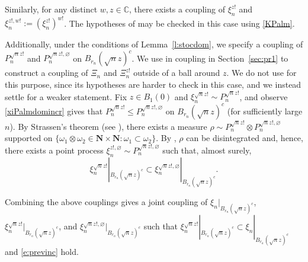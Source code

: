 \documentclass{amsart}
\theoremstyle{plain}
\theoremstyle{definition}
\theoremstyle{remark}
\begin{document}
Similarly, for any distinct $w,z \in \mathbb{C}$, there exists a coupling of $\xi_n^{z!}$  and $\xi_n^{z!, w!}  := (\xi_n^{z!})^{w!}$. The hypotheses of \cite[Theorem 1]{MR21} may be checked in this case using \eqref{KPalm}. 


Additionally, under the conditions of Lemma~\ref{l:stocdom}, we specify a coupling of $P_n^{\sqrt n z!}$ and  $P_n^{\sqrt{n} z!,\varnothing}$ on $B_{r_n}(\sqrt n z)^c$. We use in coupling in 
Section~\ref{sec:pr1} to construct a coupling of $\Xi_n$ and $\Xi_n^{z!}$ outside of a ball around $z$. 
We do not use \cite[Theorem 1]{MR21} for this purpose, since its hypotheses are harder to check in this case, and we instead settle for a weaker statement.  
Fix $z \in B_1(0)$ and $\xi_n^{\sqrt{n} z!} \sim P_n^{\sqrt{n} z!}$, and observe \eqref{xiPalmdomincr} gives that $P_n^{\sqrt n z!} \le P_n^{\sqrt{n} z!,\varnothing}$ on $B_{r_n}(\sqrt n z)^c$ (for sufficiently large $n$).
By Strassen's theorem (see \cite{lindvall}), there exists a measure $\rho \sim P_n^{\sqrt n z!} \otimes P_n^{\sqrt{n} z!,\varnothing}$ supported on $\{\omega_1 \otimes \omega_2 \in \mathbf N \times \mathbf N: \omega_1 \subset \omega_2\}$. By \cite[Theorem 3.4(i)]{K03}, $\rho$ can be disintegrated and, hence, there exists a point process $\xi_n^{z!,\varnothing}  \sim P_n^{\sqrt{n} z!,\varnothing}$ such that, almost surely,
\begin{equation}\label{e:previnc}
\xi_n^{\sqrt n z!}|_{B_{r_{n}}(\sqrt nz)^c} \subset \xi_n^{\sqrt{n} z!,\varnothing}|_{B_{r_{n}}(\sqrt nz)^c} .
\end{equation}

Combining the above couplings gives a joint coupling of $\xi_n|_{B_{r_{n}}(\sqrt nz)^c}$, $\xi_n^{\sqrt n z!}|_{B_{r_{n}}(\sqrt nz)^c}$, and  $\xi_n^{\sqrt{n} z!,\varnothing}|_{B_{r_{n}}(\sqrt nz)^c}$ such that 
$\xi_n^{\sqrt n z!}|_{B_{r_{n}}(\sqrt nz)^c} \subset \xi_n|_{B_{r_{n}}(\sqrt nz)^c}$ and \eqref{e:previnc} hold. 
\end{document}
